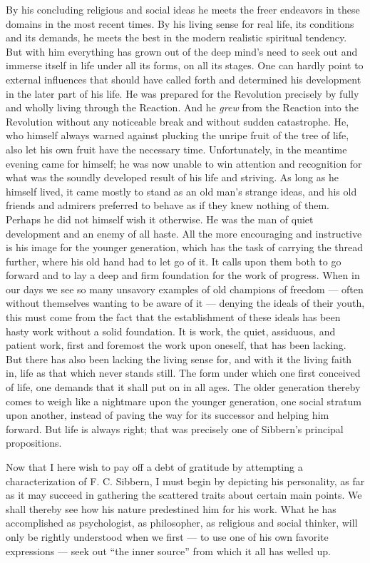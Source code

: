 \documentclass[12pt,a4paper,openany]{book}
\newcommand{\opage}[1]{\marginnote{\footnotesize\textit{[#1]}}}
\begin{document}
By his concluding religious and social ideas he meets
the freer endeavors in these domains in the most recent
times. By his living sense for real life, its
conditions and its demands, he meets the best in the modern
realistic spiritual tendency. But with him everything has grown out of
the deep mind's need to seek out and immerse itself in life
under all its forms, on all its stages. One can hardly
point to external influences that should have called forth and
determined his development in the later part of his life. He
\opage{63}was prepared for the Revolution precisely by fully and wholly
living through the Reaction. And he \emph{grew} from the Reaction
into the Revolution without any noticeable break and without sudden
catastrophe. He, who himself always warned against plucking
the unripe fruit of the tree of life, also let his own fruit
have the necessary time. Unfortunately, in the meantime evening
came for himself; he was now unable to win attention and recognition for what was
the soundly developed result of his life and striving. As long as
he himself lived, it came mostly to stand as an old man's strange
ideas, and his old friends and admirers preferred to behave as
if they knew nothing of them. Perhaps he did not himself wish it otherwise.
He was the man of quiet development and an enemy of all haste. All the more encouraging
and instructive is his image for the younger generation, which has
the task of carrying the thread further, where his old hand
had to let go of it. It calls upon them both to go
forward and to lay a deep and firm foundation for
the work of progress. When in our days we see so many
unsavory examples of old champions of freedom --- often without themselves
wanting to be aware of it --- denying the ideals of their youth,
this must come from the fact that the establishment of these ideals has
been hasty work without a solid foundation. It is
work, the quiet, assiduous, and patient work, first and
foremost the work upon oneself, that has been lacking. But there
has also been lacking the living sense for, and with it the
living faith in, life as that which never stands still. The
form under which one first conceived of life, one demands
that it shall put on in all ages. The older generation
thereby comes to weigh like a nightmare upon the younger
generation, one social stratum upon another, instead of
paving the way for its successor and helping him forward. But
life is always right; that was precisely one of Sibbern's
principal propositions.

Now that I here wish to pay off a debt of gratitude
by attempting a characterization of F. C. Sibbern, I
must begin by depicting his personality, as far
as it may succeed in gathering the scattered traits about certain
\opage{64}main points. We shall thereby see how his nature
predestined him for his work. What he has accomplished
as psychologist, as philosopher, as religious and social thinker,
will only be rightly understood when we first --- to use one of his
own favorite expressions --- seek out ``the inner source'' from which
it all has welled up.
\end{document}

